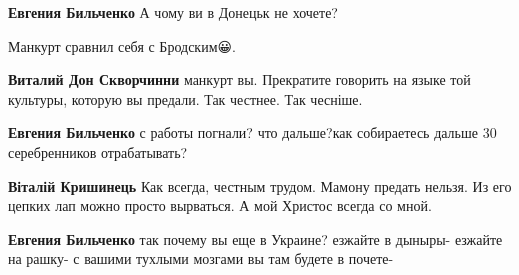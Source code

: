 \begin{itemize}
\begin{itemize}
\textbf{Евгения Бильченко} А чому ви в Донецьк не хочете?

\end{itemize}

 
Манкурт сравнил себя с Бродским😀.

\begin{itemize}
 
\textbf{Виталий Дон Скворчинни} манкурт вы. Прекратите говорить на языке той культуры, которую вы предали. Так честнее. Так чесніше.

 
\textbf{Евгения Бильченко} с работы погнали? что дальше?как собираетесь дальше 30 серебренников отрабатывать?

 
\textbf{Віталій Кришинець} Как всегда, честным трудом. Мамону предать нельзя. Из его цепких лап можно просто вырваться. А мой Христос всегда со мной.

 
\textbf{Евгения Бильченко} так почему вы еще в Украине? езжайте в дыныры- езжайте на рашку- с вашими тухлыми мозгами вы там будете в почете-

 

\end{itemize}
\end{itemize}
